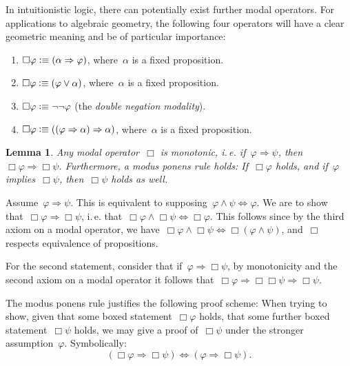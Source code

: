 \documentclass[10pt,reqno,a4paper]{amsbook}
\makeatletter
\theoremstyle{definition}
\theoremstyle{plain}
\newtheorem{lemma}[defn]{Lemma}
\theoremstyle{remark}
\newcommand{\?}{\,{:}\,}
\renewcommand{\_}{\mathpunct{.}\,}
\newcommand{\ie}{i.\,e.\@\xspace}
\newcommand{\defequiv}{\vcentcolon\equiv}
\renewenvironment{proof}[1][\proofname]{\par
  \pushQED{\qed}%
  \normalfont \topsep6\p@\@plus6\p@\relax
  \trivlist
  \item[\hskip\labelsep
        \itshape
    #1\@addpunct{.}]\ignorespaces
}{%
  \popQED\endtrivlist\@endpefalse
}
\makeatother
\begin{document}
In intuitionistic logic, there can potentially exist further modal operators.
For applications to algebraic geometry, the following four operators will have
a clear geometric meaning and be of particular importance:
\begin{enumerate}
\item $\Box\varphi \defequiv (\alpha \Rightarrow \varphi)$, where~$\alpha$ is a
fixed proposition.
\item $\Box\varphi \defequiv (\varphi \vee \alpha)$, where~$\alpha$ is a
fixed proposition.
\item $\Box\varphi \defequiv \neg\neg\varphi$ (the \emph{double negation
modality}).
\item $\Box\varphi \defequiv ((\varphi \Rightarrow \alpha) \Rightarrow \alpha)$,
where~$\alpha$ is a fixed proposition.
\end{enumerate}

\begin{lemma}Any modal operator~$\Box$ is monotonic, \ie if~$\varphi
\Rightarrow \psi$, then~$\Box\varphi \Rightarrow \Box\psi$. Furthermore,
a modus ponens rule holds: If~$\Box\varphi$ holds, and if~$\varphi$
implies~$\Box\psi$, then~$\Box\psi$ holds as well.\end{lemma}
\begin{proof}Assume~$\varphi \Rightarrow \psi$. This is equivalent to
supposing~$\varphi \wedge \psi \Leftrightarrow \varphi$. We are to show
that~$\Box\varphi \Rightarrow \Box\psi$, \ie that~$\Box\varphi \wedge
\Box\psi \Leftrightarrow \Box\varphi$. This follows since by the third
axiom on a modal operator, we have~$\Box\varphi \wedge \Box\psi \Leftrightarrow
\Box(\varphi \wedge \psi)$, and~$\Box$ respects equivalence of propositions.

For the second statement, consider that if~$\varphi \Rightarrow \Box\psi$, by
monotonicity and the second axiom on a modal operator it follows
that~$\Box\varphi \Rightarrow \Box\Box\psi \Rightarrow \Box\psi$.
\end{proof}

\label{proof-scheme-boxed-statements}The modus ponens rule justifies the
following proof scheme: When trying to show, given that some boxed
statement~$\Box\varphi$ holds, that some further boxed statement~$\Box\psi$
holds, we may give a proof of~$\Box\psi$ under the stronger
assumption~$\varphi$. Symbolically:
\[ (\Box\varphi \Rightarrow \Box\psi) \Longleftrightarrow
  (\varphi \Rightarrow \Box\psi). \]
\end{document}
